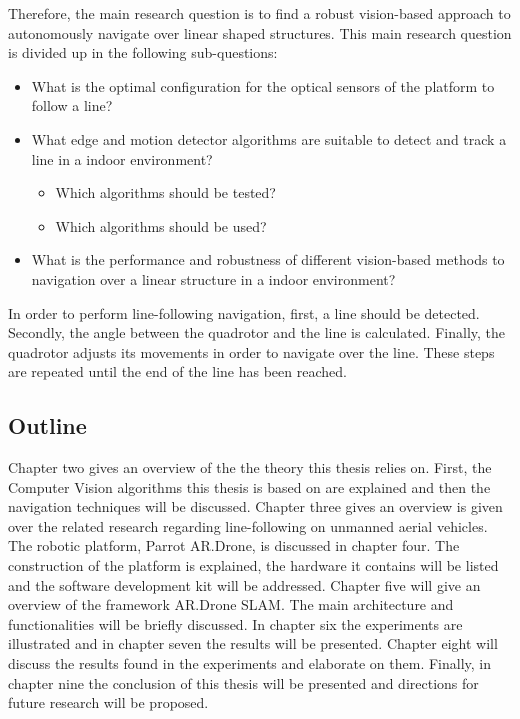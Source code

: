 \documentclass[a4paper]{article}
\begin{document}
Therefore, the main research question is to find a robust vision-based approach to autonomously navigate over linear shaped structures. This main research question is divided up in the following sub-questions:
\begin{itemize}
\item What is the optimal configuration for the optical sensors of the platform to follow a line?
\item What edge and motion detector algorithms are suitable to detect and track a line in a indoor environment?
	\begin{itemize}
	\item Which algorithms should be tested?
	\item Which algorithms should be used?
	\end{itemize}
\item What is the performance and robustness of different vision-based methods to navigation over a linear structure in a indoor environment?
\end{itemize}
In order to perform line-following navigation, first, a line should be detected. Secondly, the angle between the quadrotor and the line is calculated. Finally, the quadrotor adjusts its movements in order to navigate over the line. These steps are repeated until the end of the line has been reached.

\subsection{Outline}
Chapter two gives an overview of the the theory this thesis relies on. First, the Computer Vision algorithms this thesis is based on are explained and then the navigation techniques will be discussed. Chapter three gives an overview is given over the related research regarding line-following on unmanned aerial vehicles. The robotic platform, Parrot AR.Drone, is discussed in chapter four. The construction of the platform is explained, the hardware it contains will be listed and the software development kit will be addressed. Chapter five will give an overview of the framework AR.Drone SLAM. The main architecture and functionalities will be briefly discussed. In chapter six the experiments are illustrated and in chapter seven the results will be presented. Chapter eight will discuss the results found in the experiments and elaborate on them. Finally, in chapter nine the conclusion of this thesis will be presented and directions for future research will be proposed.
\end{document}
